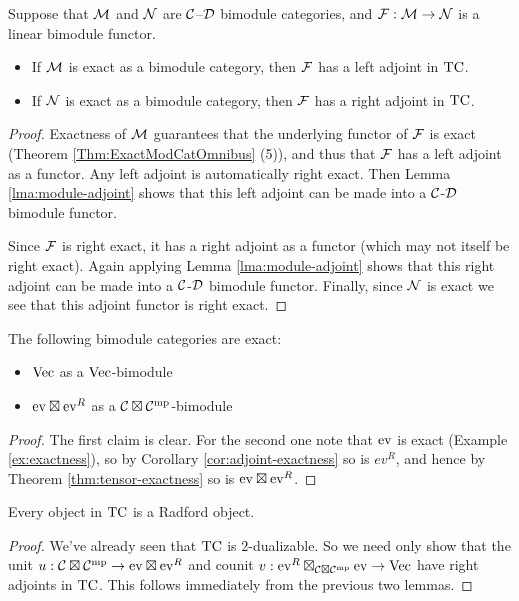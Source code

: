 \documentclass{amsart}
\begin{document}
\begin{lemma}
Suppose that $\cM$ and $\cN$ are $\cC$--$\cD$ bimodule categories, and $\cF: \cM \rightarrow \cN$ is a linear bimodule functor.
\begin{itemize}
\item If $\cM$ is exact as a bimodule category, then $\cF$ has a left adjoint in $\TC$.
\item If $\cN$ is exact as a bimodule category, then $\cF$ has a right adjoint in $\TC$.
\end{itemize}
\end{lemma}

\begin{proof}
Exactness of $\cM$ guarantees that the underlying functor of $\cF$ is exact (Theorem \ref{Thm:ExactModCatOmnibus} (5)), and thus that $\cF$ has a left adjoint as a functor.  Any left adjoint is automatically right exact.  Then Lemma \ref{lma:module-adjoint} shows that this left adjoint can be made into a $\cC$-$\cD$ bimodule functor.   

Since $\cF$ is right exact, it has a right adjoint as a functor (which may not itself be right exact).  Again applying Lemma \ref{lma:module-adjoint} shows that this right adjoint can be made into a $\cC$-$\cD$ bimodule functor.   Finally, since $\cN$ is exact we see that this adjoint functor is right exact.
\end{proof}

\begin{lemma}
The following bimodule categories are exact:
\begin{itemize}
\item $\Vec$ as a $\Vec$-bimodule
\item $\ev \boxtimes \ev^R$ as a $\cC \boxtimes \cC^\mp$-bimodule
\end{itemize}
\end{lemma}
\begin{proof}
The first claim is clear.  For the second one note that $\ev$ is exact (Example \ref{ex:exactness}), so by Corollary \ref{cor:adjoint-exactness} so is $ev^R$, and hence by Theorem \ref{thm:tensor-exactness} so is $\ev \boxtimes \ev^R$.
\end{proof}

\begin{theorem} \label{thm:TCisRadford}
Every object in $\TC$ is a Radford object.
\end{theorem}
\begin{proof}
We've already seen that $\TC$ is $2$-dualizable.  So we need only show that the unit $u: \cC \boxtimes \cC^\mp \rightarrow \ev \boxtimes \ev^R$ and counit $v: \ev^R \boxtimes_{\cC \boxtimes \cC^\mp} \ev \rightarrow \Vec$ have right adjoints in $\TC$.  This follows immediately from the previous two lemmas.
\end{proof}
\end{document}
